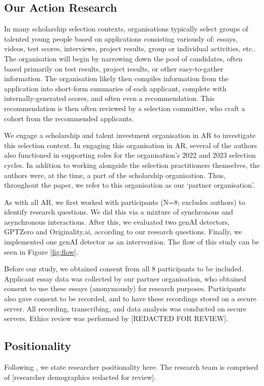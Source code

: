 \subsection{Our Action Research}
In many scholarship selection contexts, organisations typically select groups of talented young people based on applications consisting variously of: essays, videos, test scores, interviews, project results, group or individual activities, etc.. The organisation will begin by narrowing down the pool of candidates, often based primarily on test results, project results, or other easy-to-gather information. The organisation likely then compiles information from the application into short-form summaries of each applicant, complete with internally-generated scores, and often even a recommendation. This recommendation is then often reviewed by a selection committee, who craft a cohort from the recommended applicants.

We engage a scholarship and talent investment organisation in AR to investigate this selection context. In engaging this organisation in AR, several of the authors also functioned in supporting roles for the organisation's 2022 and 2023 selection cycles. In addition to working alongside the selection practitioners themselves, the authors were, at the time, a part of the scholarship organisation. Thus, throughout the paper, we refer to this organisation as our `partner organisation'. 

As with all AR, we first worked with participants (N=8; excludes authors) to identify research questions. We did this via a mixture of synchronous and asynchronous interactions. After this, we evaluated two genAI detectors, GPTZero and Originality.ai, according to our research questions. Finally, we implemented one genAI detector as an intervention. The flow of this study can be seen in Figure \ref{fig:flow}.

Before our study, we obtained consent from all 8 participants to be included. Applicant essay data was collected by our partner organisation, who obtained consent to use these essays (anonymously) for research purposes. Participants also gave consent to be recorded, and to have these recordings stored on a secure server. All recording, transcribing, and data analysis was conducted on secure servers. Ethics review was performed by [REDACTED FOR REVIEW].

\subsection{Positionality}
Following \textcite{Venn-Wycherley_Kharrufa_Lechelt_Nicholson_Howland_Almjally_Trory_Sarangapani_2024}, we state researcher positionality here. The research team is comprised of [researcher demographics redacted for review].

